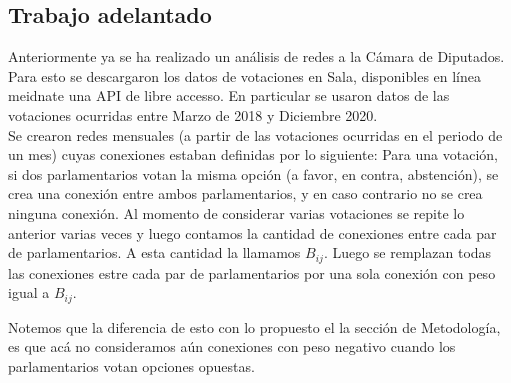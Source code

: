 \documentclass{proyectotesis}
\begin{document}
\subsection{Trabajo adelantado}
Anteriormente ya se ha realizado un análisis de redes a la Cámara de Diputados. Para esto se descargaron los datos de votaciones en Sala, disponibles en línea meidnate una API de libre accesso. En particular se usaron datos de las votaciones ocurridas entre Marzo de 2018 y Diciembre 2020.\\

Se crearon redes mensuales (a partir de las votaciones ocurridas en el periodo de un mes) cuyas conexiones estaban definidas por lo siguiente: Para una votación, si dos parlamentarios votan la misma opción (a favor, en contra, abstención), se crea una conexión entre ambos parlamentarios, y en caso contrario no se crea ninguna conexión. Al momento de considerar varias votaciones se repite lo anterior varias veces y luego contamos la cantidad de conexiones entre cada par de parlamentarios. A esta cantidad la llamamos $B_{ij}$. Luego se remplazan todas las conexiones estre cada par de parlamentarios por una sola conexión con peso igual a $B_{ij}$.

Notemos que la diferencia de esto con lo propuesto el la sección de Metodología, es que acá no consideramos aún conexiones con peso negativo cuando los parlamentarios votan opciones opuestas. \\
\end{document}
